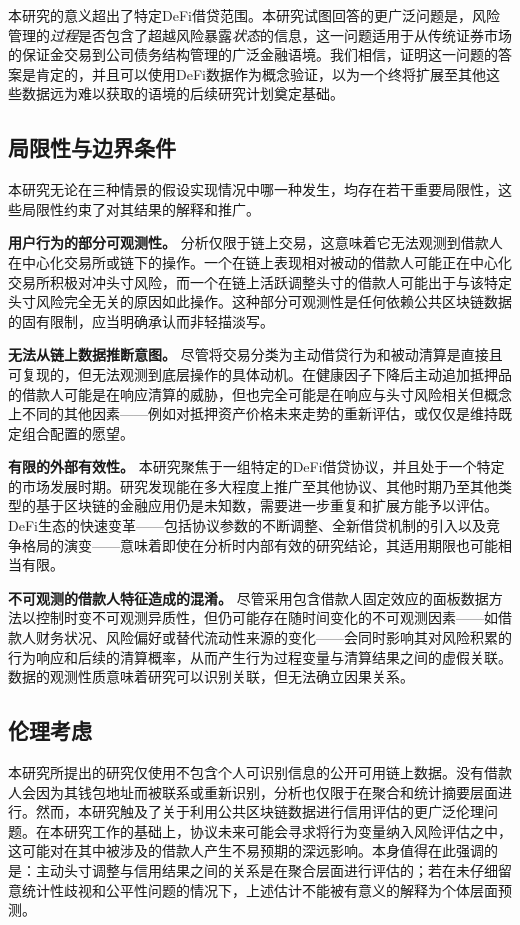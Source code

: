 本研究的意义超出了特定DeFi借贷范围。本研究试图回答的更广泛问题是，风险管理的\emph{过程}是否包含了超越风险暴露\emph{状态}的信息，这一问题适用于从传统证券市场的保证金交易到公司债务结构管理的广泛金融语境。我们相信，证明这一问题的答案是肯定的，并且可以使用DeFi数据作为概念验证，以为一个终将扩展至其他这些数据远为难以获取的语境的后续研究计划奠定基础。

\subsection{局限性与边界条件}

本研究无论在三种情景的假设实现情况中哪一种发生，均存在若干重要局限性，这些局限性约束了对其结果的解释和推广。

\textbf{用户行为的部分可观测性。} 分析仅限于链上交易，这意味着它无法观测到借款人在中心化交易所或链下的操作。一个在链上表现相对被动的借款人可能正在中心化交易所积极对冲头寸风险，而一个在链上活跃调整头寸的借款人可能出于与该特定头寸风险完全无关的原因如此操作。这种部分可观测性是任何依赖公共区块链数据的固有限制，应当明确承认而非轻描淡写。

\textbf{无法从链上数据推断意图。} 尽管将交易分类为主动借贷行为和被动清算是直接且可复现的，但无法观测到底层操作的具体动机。在健康因子下降后主动追加抵押品的借款人可能是在响应清算的威胁，但也完全可能是在响应与头寸风险相关但概念上不同的其他因素——例如对抵押资产价格未来走势的重新评估，或仅仅是维持既定组合配置的愿望。

\textbf{有限的外部有效性。} 本研究聚焦于一组特定的DeFi借贷协议，并且处于一个特定的市场发展时期。研究发现能在多大程度上推广至其他协议、其他时期乃至其他类型的基于区块链的金融应用仍是未知数，需要进一步重复和扩展方能予以评估。DeFi生态的快速变革——包括协议参数的不断调整、全新借贷机制的引入以及竞争格局的演变——意味着即使在分析时内部有效的研究结论，其适用期限也可能相当有限。

\textbf{不可观测的借款人特征造成的混淆。} 尽管采用包含借款人固定效应的面板数据方法以控制时变不可观测异质性，但仍可能存在随时间变化的不可观测因素——如借款人财务状况、风险偏好或替代流动性来源的变化——会同时影响其对风险积累的行为响应和后续的清算概率，从而产生行为过程变量与清算结果之间的虚假关联。数据的观测性质意味着研究可以识别关联，但无法确立因果关系。

\subsection{伦理考虑}

本研究所提出的研究仅使用不包含个人可识别信息的公开可用链上数据。没有借款人会因为其钱包地址而被联系或重新识别，分析也仅限于在聚合和统计摘要层面进行。然而，本研究触及了关于利用公共区块链数据进行信用评估的更广泛伦理问题。在本研究工作的基础上，协议未来可能会寻求将行为变量纳入风险评估之中，这可能对在其中被涉及的借款人产生不易预期的深远影响。本身值得在此强调的是：主动头寸调整与信用结果之间的关系是在聚合层面进行评估的；若在未仔细留意统计性歧视和公平性问题的情况下，上述估计不能被有意义的解释为个体层面预测。

